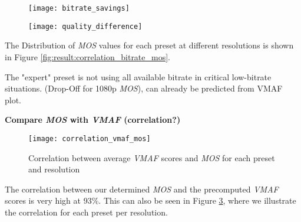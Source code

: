 \begin{figure}[htb!]
	\centering
	\texttt{[image: bitrate\_savings]}
	\caption{}
	\label{fig:result:bitrate_savings}
\end{figure}
\begin{figure}[htb!]
	\centering
	\texttt{[image: quality\_difference]}
	\caption{}
	\label{fig:result:quality_difference}
\end{figure}

The Distribution of \textit{MOS} values for each preset at different resolutions is shown in Figure \ref{fig:result:correlation_bitrate_mos}.

The "expert" preset is not using all available bitrate in critical low-bitrate situations. (Drop-Off for 1080p \textit{MOS}), can already be predicted from VMAF plot.


\textbf{Compare \textit{MOS} with \textit{VMAF} (correlation?)}
\begin{figure}[htb!]
	\centering
	\texttt{[image: correlation\_vmaf\_mos]}
	\caption{Correlation between average \textit{VMAF} scores and \textit{MOS} for each preset and resolution}
	\label{fig:result:correlation_vmaf_mos}
\end{figure}

The correlation between our determined \textit{MOS} and the precomputed \textit{VMAF} scores is very high at 93\%. This can also be seen in Figure \ref{fig:result:correlation_vmaf_mos}, where we illustrate the correlation for each preset per resolution.
\\
